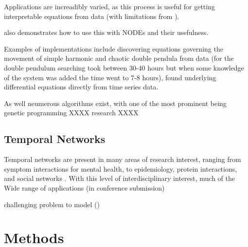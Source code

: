\documentclass[12pt]{article}
\begin{document}
        Applications are increadibly varied, as this process is useful for getting interpretable equations from data (with limitations from \cite{kidger2022neural}).

        \cite{kidger2022neural} also demonstrates how to use this with NODEs and their usefulness.

        Examples of implementations include discovering equations governing the movement of simple harmonic and chaotic double pendula from data \cite{schmidt2009distilling}(for the double pendulum searching took between 30-40 hours but when some knowledge of the system was added the time went to 7-8 hours), found underlying differential equations directly from time series data\cite{bongard2007automated}.  

        As well neumerous algorithms exist, with one of the most prominent being genetic programming XXXX research XXXX

    \subsection{Temporal Networks}
        Temporal networks are present in many areas of research interest, ranging from symptom interactions for mental health, to epidemiology, protein interactions, and social networks \cite{jordan2020current,contreras2020temporal,lucas2021inferring,jin2009identifying,masuda2013predicting,moinet2015burstiness,hanneke2010discrete}. With this level of interdisciplinary interest, much of the 
        Wide range of applications (in conference submission)

        challenging problem to model ()


\section{Methods}
    
\end{document}
